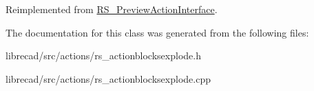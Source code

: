 Reimplemented from \hyperlink{classRS__PreviewActionInterface_ae2c5528899a0e863f1ec227d91411ac9}{R\-S\-\_\-\-Preview\-Action\-Interface}.



The documentation for this class was generated from the following files\-:\begin{DoxyCompactItemize}
\item 
librecad/src/actions/rs\-\_\-actionblocksexplode.\-h\item 
librecad/src/actions/rs\-\_\-actionblocksexplode.\-cpp\end{DoxyCompactItemize}
